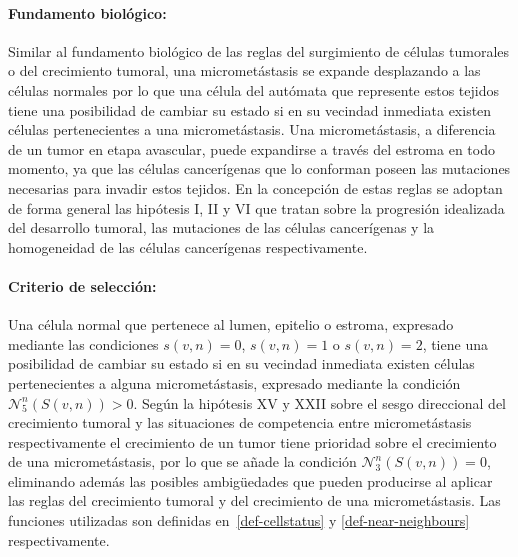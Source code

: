 \paragraph*{{Fundamento biol\'ogico}:} Similar al fundamento biol\'ogico de las reglas del surgimiento de c\'elulas tumorales o del crecimiento tumoral, una micromet\'astasis se expande desplazando a las c\'elulas normales por lo que una c\'elula del aut\'omata que represente estos tejidos tiene una posibilidad de cambiar su estado si en su vecindad inmediata existen c\'elulas pertenecientes a una micromet\'astasis. Una micromet\'astasis, a diferencia de un tumor en etapa avascular, puede expandirse a trav\'es del estroma en todo momento, ya que las c\'elulas cancer\'igenas que lo conforman poseen las mutaciones necesarias para invadir estos tejidos. En la concepci\'on de estas reglas se adoptan de forma general las hip\'otesis I, II y VI que tratan sobre la progresi\'on idealizada del desarrollo tumoral, las mutaciones de las c\'elulas cancer\'igenas y la homogeneidad de las c\'elulas cancer\'igenas respectivamente. 

\paragraph*{{Criterio de selecci\'on}:} Una c\'elula normal que pertenece al lumen, epitelio o estroma, expresado mediante las condiciones $s(v,n)=0$, $s(v,n)=1$ o $s(v,n)=2$, tiene una posibilidad de cambiar su estado si en su vecindad inmediata existen c\'elulas pertenecientes a alguna micromet\'astasis, expresado mediante la condici\'on $\mathcal{N}_5^n(S(v,n))>0$. Seg\'un la hip\'otesis XV y XXII sobre el sesgo direccional del crecimiento tumoral y las situaciones de competencia entre micromet\'astasis respectivamente el crecimiento de un tumor tiene prioridad sobre el crecimiento de una micromet\'astasis, por lo que se a\~nade la condici\'on $\mathcal{N}_3^n(S(v,n))=0$, eliminando adem\'as las posibles ambig\"uedades que pueden producirse al aplicar las reglas del crecimiento tumoral y del crecimiento de una micromet\'astasis. Las funciones utilizadas son definidas en~\ref{def-cellstatus} y \ref{def-near-neighbours} respectivamente.

